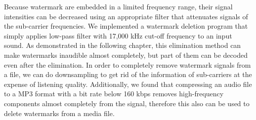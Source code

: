 Because watermark are embedded in a limited frequency range, their signal intensities can be decreased using an appropriate filter that attenuates signals of the sub-carrier frequencies.
We implemented a watermark deletion program that simply applies low-pass filter with 17,000 kHz cut-off frequency to an input sound.
As demonstrated in the following chapter, this elimination method can make watermarks inaudible almost completely, but part of them can be decoded even after the elimination.
In order to completely remove watermark signals from a file, we can do downsampling to get rid of the information of sub-carriers at the expense of listening quality.
Additionally, we found that compressing an audio file to a MP3 format with a bit rate below 160 kbps removes high-frequency components almost completely from the signal, therefore this also can be used to delete watermarks from a media file.
